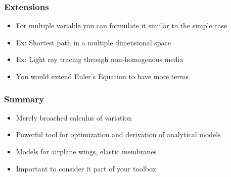 \documentclass[10pt]{beamer}
\begin{document}
\begin{frame}
  \frametitle{Extensions}
  \begin{itemize}
  \item For multiple variable you can formulate it similar to the simple case
  \item Ex: Shortest path in a multiple dimensional space
  \item Ex: Light ray tracing through non-homogenous media
  \item You would extend Euler's Equation to have more terms
  \end{itemize}
\end{frame}

\begin{frame}
  \frametitle{Summary}
  \begin{itemize}
  \item Merely broached calculus of variation
  \item Powerful tool for optimization and derivation of analytical models
  \item Models for airplane wings, elastic membranes
  \item Important to consider it part of your toolbox
  \end{itemize}
\end{frame}
\end{document}
